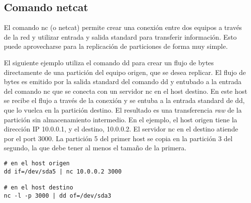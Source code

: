 \subsection{Comando netcat}

El comando nc (o netcat) permite crear una conexión entre dos equipos a través de la red y utilizar entrada y salida standard para transferir información. Esto puede aprovecharse para la replicación de particiones de forma muy simple.

El siguiente ejemplo utiliza el comando dd para crear un flujo de bytes directamente de una partición del equipo origen, que se desea replicar. El flujo de bytes es emitido por la salida standard del comando dd y entubado a la entrada del comando nc que se conecta con un servidor nc en el host destino. En este host se recibe el flujo a través de la conexión y se entuba a la entrada standard de dd, que lo vuelca en la partición destino. El resultado es una transferencia \emph{raw} de la partición sin almacenamiento intermedio. En el ejemplo, el host origen tiene la dirección IP 10.0.0.1, y el destino, 10.0.0.2. El servidor nc en el destino atiende por el port 3000. La partición 5 del primer host se copia en la partición 3 del segundo, la que debe tener al menos el tamaño de la primera.

\begin{lstlisting}
# en el host origen
dd if=/dev/sda5 | nc 10.0.0.2 3000

# en el host destino
nc -l -p 3000 | dd of=/dev/sda3
\end{lstlisting}

